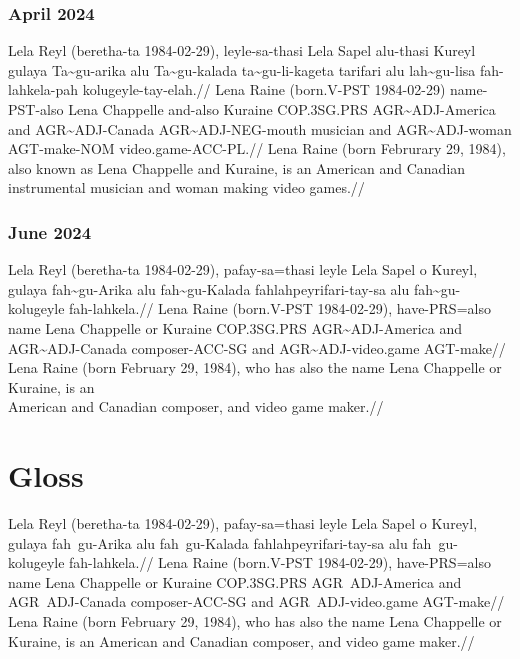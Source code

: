 \subsubsection*{April 2024}

\ex
\begingl
\gla Lela Reyl   (beretha-ta 1984-02-29),   leyle-sa-thasi Lela Sapel      alu-thasi Kureyl gulaya       Ta\~{}gu-arika     alu Ta\~{}gu-kalada   ta\~{}gu-li-kageta   tarifari alu lah\~{}gu-lisa   fah-lahkela-pah kolugeyle-tay-elah.//
\glb Lena Raine  (born.V-PST 1984-02-29)    name-PST-also  Lena Chappelle  and-also  Kuraine COP.3SG.PRS AGR\~{}ADJ-America and AGR\~{}ADJ-Canada AGR\~{}ADJ-NEG-mouth musician and AGR\~{}ADJ-woman AGT-make-NOM    video.game-ACC-PL.//
\glft Lena Raine  (born Februrary 29, 1984), also known as Lena Chappelle and Kuraine, is an American and Canadian instrumental musician and woman making video games.//
\endgl
\xe

\newpage

\subsubsection*{June 2024}

\ex
\begingl
\gla Lela Reyl  (beretha-ta 1984-02-29), pafay-sa=thasi leyle Lela Sapel     o  Kureyl, gulaya      fah\~{}gu-Arika    alu fah\~{}gu-Kalada  fahlahpeyrifari-tay-sa alu fah\~{}gu-kolugeyle   fah-lahkela.//
\glb Lena Raine (born.V-PST 1984-02-29), have-PRS=also  name  Lena Chappelle or Kuraine COP.3SG.PRS AGR\~{}ADJ-America and AGR\~{}ADJ-Canada composer-ACC-SG        and AGR\~{}ADJ-video.game AGT-make//
\glft Lena Raine (born February 29, 1984), who has also the name Lena Chappelle or Kuraine, is an \\American and Canadian composer, and video game maker.//
\endgl
\xe

\section{Gloss}

\ex
\begingl
\gla  Lela Reyl (beretha-ta 1984-02-29), pafay-sa=thasi leyle Lela Sapel o Kureyl, gulaya fah~gu-Arika alu fah~gu-Kalada fahlahpeyrifari-tay-sa alu fah~gu-kolugeyle fah-lahkela.//
\glb  Lena Raine (born.V-PST 1984-02-29), have-PRS=also name Lena Chappelle or Kuraine COP.3SG.PRS AGR~ADJ-America and AGR~ADJ-Canada composer-ACC-SG and AGR~ADJ-video.game AGT-make//
\glft Lena Raine (born February 29, 1984), who has also the name Lena Chappelle or Kuraine, is an American and Canadian composer, and video game maker.//
\endgl 
\xe

